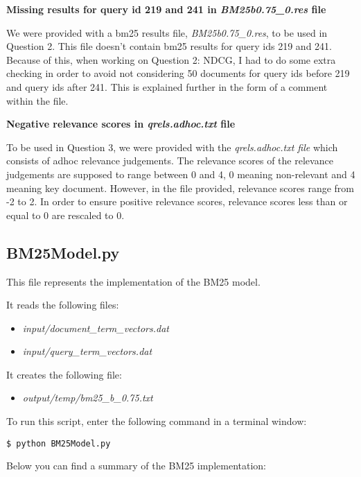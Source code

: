 \documentclass{article} %
\begin{document}
\textbf{Missing results for query id 219 and 241 in \textit{BM25b0.75\_0.res} file}

We were provided with a bm25 results file, \textit{BM25b0.75\_0.res}, to be used in Question 2. This file doesn't contain bm25 results for query ids 219 and 241. Because of this, when working on Question 2: NDCG, I had to do some extra checking in order to avoid not considering 50 documents for query ids before 219 and query ids after 241. This is explained further in the form of a comment within the file.

\textbf{Negative relevance scores in \textit{qrels.adhoc.txt} file}

To be used in Question 3, we were provided with the \textit{qrels.adhoc.txt file} which consists of adhoc relevance judgements. The relevance scores of the relevance judgements are supposed to range between 0 and 4, 0 meaning non-relevant and 4 meaning key document. However, in the file provided, relevance scores range from -2 to 2. In order to ensure positive relevance scores, relevance scores less than or equal to 0 are rescaled to 0.

\subsection*{BM25Model.py \cite{okapibm25}}

This file represents the implementation of the BM25 model.

It reads the following files:

\begin{itemize}
    \item \textit{input/document\_term\_vectors.dat}
    \item \textit{input/query\_term\_vectors.dat}
\end{itemize}

It creates the following file:

\begin{itemize}
    \item \textit{output/temp/bm25\_b\_0.75.txt}
\end{itemize}

To run this script, enter the following command in a terminal window:

\begin{lstlisting}[style=Bash]
  $ python BM25Model.py
\end{lstlisting}

Below you can find a summary of the BM25 implementation:
\end{document}
